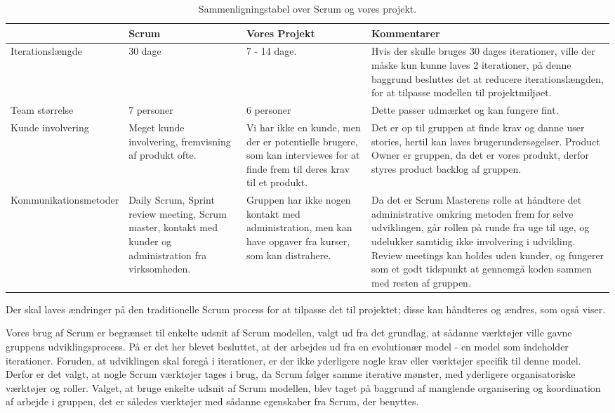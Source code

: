 \begin{sidewaystable}
      \begin{tabular}{p{5cm}p{5cm}p{5cm}p{5cm}}
	       				 & Scrum  & Vores Projekt & Kommentarer  \\ \hline

	   Iterationslængde  		
	   		& 30 dage 
	   		& 7 - 14 dage. 
	   		& Hvis der skulle bruges 30 dages iterationer, ville der måske kun kunne laves 2 iterationer, på denne baggrund besluttes det at reducere iterationslængden, for at tilpasse modellen til projektmiljøet.\\
	   		
	   Team størrelse    		
	   		& 7 personer
	   		& 6 personer 
	   		& Dette passer udmærket og kan fungere fint. \\
	   		
	   Kunde involvering 		
	   		& Meget kunde involvering, fremvisning af produkt ofte.
	   		& Vi har ikke en kunde, men der er potentielle brugere, som kan interviewes for at finde frem til deres krav til et produkt.
	   		& Det er op til gruppen at finde krav og danne user stories, hertil kan laves brugerundersøgelser. Product Owner er gruppen, da det er vores produkt, derfor styres product backlog af gruppen.\\
	   		
	   Kommunikationsmetoder	
	   		& Daily Scrum, Sprint review meeting, Scrum master, kontakt med kunder og administration fra virksomheden.
	   		& Gruppen har ikke nogen kontakt med administration, men kan have opgaver fra kurser, som kan distrahere. 
	   		& Da det er Scrum Masterens rolle at håndtere det administrative omkring metoden frem for selve udviklingen, går rollen på runde fra uge til uge, og udelukker samtidig ikke involvering i udvikling. Review meetings kan holdes uden kunder, og fungerer som et godt tidspunkt at gennemgå koden sammen med resten af gruppen. \\
    \end{tabular}
  \caption{Sammenligningstabel over Scrum og vores projekt.}\label{tabel:sammenligningstabel}
\end{sidewaystable}

Der skal laves ændringer på den traditionelle Scrum process for at tilpasse det til projektet; disse kan håndteres og ændres, som  også viser.

Vores brug af Scrum er begrænset til enkelte udsnit af Scrum modellen, valgt ud fra det grundlag, at sådanne værktøjer ville gavne gruppens udviklingsprocess.
På  er det her blevet besluttet, at der arbejdes ud fra en evolutionær model - en model som indeholder iterationer.
Foruden, at udviklingen skal foregå i iterationer, er der ikke yderligere nogle krav eller værktøjer specifik til denne model.
Derfor er det valgt, at nogle Scrum værktøjer tages i brug, da Scrum følger samme iterative mønster, med yderligere organisatoriske værktøjer og roller.
Valget, at bruge enkelte udsnit af Scrum modellen, blev taget på baggrund af manglende organisering og koordination af arbejde i gruppen, det er således værktøjer med sådanne egenskaber fra Scrum, der benyttes.

